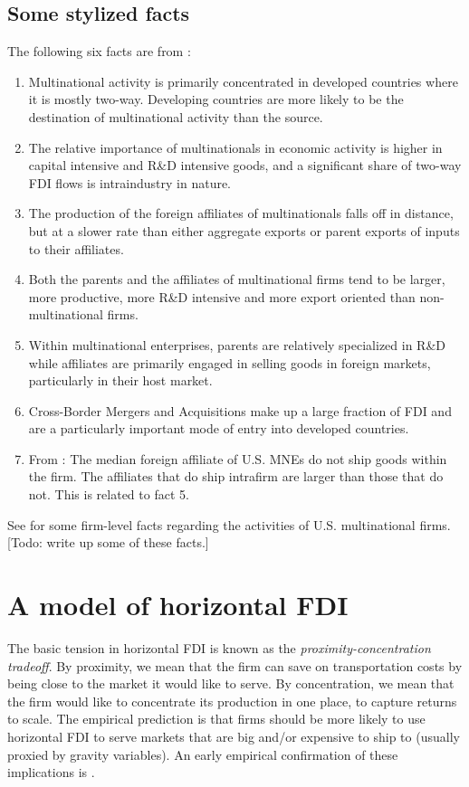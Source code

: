 \documentclass[11pt, pdftex]{article}
\begin{document}
\subsection{Some stylized facts}
The following six facts are from \citet{ayhandbook}:
\begin{enumerate}
  \item Multinational activity is primarily concentrated in developed countries where it is mostly
    two-way. Developing countries are more likely to be the destination of multinational activity than the source.

    \item The relative importance of multinationals in economic activity is higher in capital intensive
    and R\&D intensive goods, and a significant share of two-way FDI flows is intraindustry in nature.

    \item The production of the foreign affiliates of multinationals falls off in distance, but at a
slower rate than either aggregate exports or parent exports of inputs to their affiliates.

    \item Both the parents and the affiliates of multinational firms tend to be larger, more productive,
    more R\&D intensive and more export oriented than non-multinational firms.

    \item Within multinational enterprises, parents are relatively specialized in R\&D while affiliates
    are primarily engaged in selling goods in foreign markets, particularly in their host market.

    \item Cross-Border Mergers and Acquisitions make up a large fraction of FDI and are a particularly
important mode of entry into developed countries.

    \item From \citet{ramondoRapRuhl}: The median foreign affiliate of U.S. MNEs do not ship goods within the firm. The affiliates that do ship intrafirm are larger than those that do not. This is related to fact 5.

\end{enumerate}

See \citet{ramondoRapRuhl} for some firm-level facts regarding the activities of U.S. multinational firms. [Todo: write up some of these facts.]

\section{A model of horizontal FDI}
The basic tension in horizontal FDI is known as the \textit{proximity-concentration tradeoff}. By proximity, we mean that the firm can save on transportation costs by being close to the market it would like to serve.  By concentration, we mean that the firm would like to concentrate its production in one place, to capture returns to scale. The empirical prediction is that firms should be more likely to use horizontal FDI to serve markets that are big and/or expensive to ship to (usually proxied by gravity variables). An early empirical confirmation of these implications is \citet{B97}.
\end{document}
